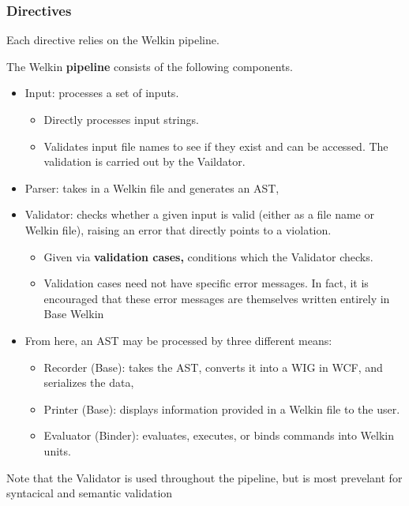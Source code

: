 \begin{itemize}
\subsubsection*{Directives}
Each directive relies on the Welkin pipeline.

\begin{definition}[Pipeline]

The Welkin \textbf{pipeline} consists of the following components.

\begin{itemize}
  \item Input: processes a set of inputs.
  \begin{itemize}
    \item Directly processes input strings.
    \item Validates input file names to see if they exist and can be accessed. The validation is carried out by the Vaildator.
  \end{itemize}
  \item Parser: takes in a Welkin file and generates an AST,
  \item Validator: checks whether a given input is valid (either as a file name or Welkin file), raising an error that directly points to a violation.
      \begin{itemize}
\item Given via \textbf{validation cases,} conditions which the Validator checks.
  \item Validation cases need not have specific error messages. In fact, it is encouraged that these error messages are themselves written entirely in Base Welkin %
\end{itemize}
  \item From here, an AST may be processed by three different means:
		\begin{itemize}
		  \item Recorder (Base): takes the AST, converts it into a WIG in WCF, and serializes the data,
		  \item Printer (Base): displays information provided in a Welkin file to the user.
		  \item Evaluator (Binder): evaluates, executes, or binds commands into Welkin units.
		\end{itemize}
\end{itemize}
Note that the Validator is used throughout the pipeline, but is most prevelant for syntacical and semantic validation
\end{definition}


\end{itemize}
